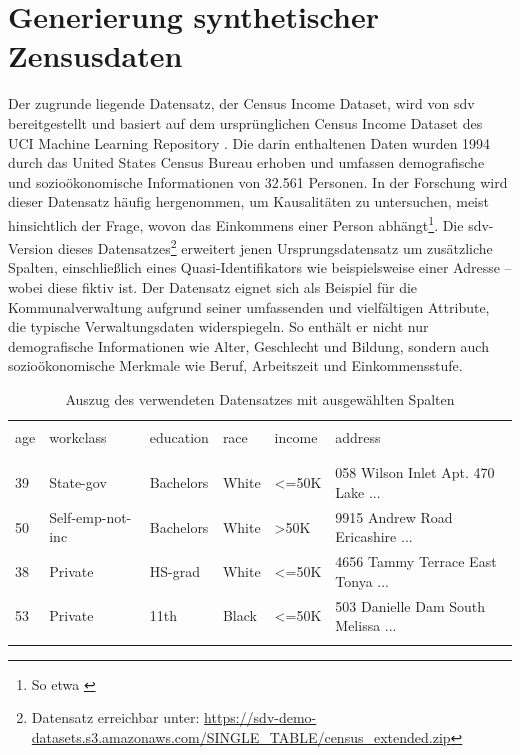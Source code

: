 \section{Generierung synthetischer Zensusdaten}
\begin{spacing}{1.5}

Der zugrunde liegende Datensatz, der Census Income Dataset, wird von \acrshort{sdv} bereitgestellt und basiert auf dem ursprünglichen Census Income Dataset des UCI Machine Learning Repository \cite{misc_adult_2}. Die darin enthaltenen Daten wurden 1994 durch das United States Census Bureau erhoben und umfassen demografische und sozioökonomische Informationen von 32.561 Personen. In der Forschung wird dieser Datensatz häufig hergenommen, um Kausalitäten zu untersuchen, meist hinsichtlich der Frage, wovon das Einkommens einer Person abhängt\footnote{So etwa \cite{lazar_income_2004, islam_rana_investigation_2024, chakrabarty_statistical_2018}}. Die \acrshort{sdv}-Version dieses Datensatzes\footnote{Datensatz erreichbar unter: \url{https://sdv-demo-datasets.s3.amazonaws.com/SINGLE_TABLE/census_extended.zip}} erweitert jenen Ursprungsdatensatz um zusätzliche Spalten, einschließlich eines Quasi-Identifikators wie beispielsweise einer Adresse -- wobei diese fiktiv ist. Der Datensatz eignet sich als Beispiel für die Kommunalverwaltung aufgrund seiner umfassenden und vielfältigen Attribute, die typische Verwaltungsdaten widerspiegeln. So enthält er nicht nur demografische Informationen wie Alter, Geschlecht und Bildung, sondern auch sozioökonomische Merkmale wie Beruf, Arbeitszeit und Einkommensstufe.

\begin{table}[!htb]
    \centering\footnotesize
    \begin{tabular}{llllll}
        \toprule
        \\[-0.7em]
        age & workclass & education & race & income & address \\
        \\[-0.9em]
        \midrule
        \\[-0.7em]
        39 & State-gov & Bachelors & White & <=50K & 058 Wilson Inlet Apt. 470 Lake ...\\
        50 & Self-emp-not-inc & Bachelors & White & >50K & 9915 Andrew Road Ericashire ...\\
        38 & Private & HS-grad & White & <=50K & 4656 Tammy Terrace East Tonya ...\\
        53 & Private & 11th & Black & <=50K & 503 Danielle Dam South Melissa ...\\
        \\[-0.9em]
        \bottomrule
    \end{tabular}
    \caption[Auszug des verwendeten Datensatzes mit ausgewählten Spalten]{Auszug des verwendeten Datensatzes mit ausgewählten Spalten\footnotemark}
    \label{tab:census-data-sample}
\end{table}


\end{spacing}
